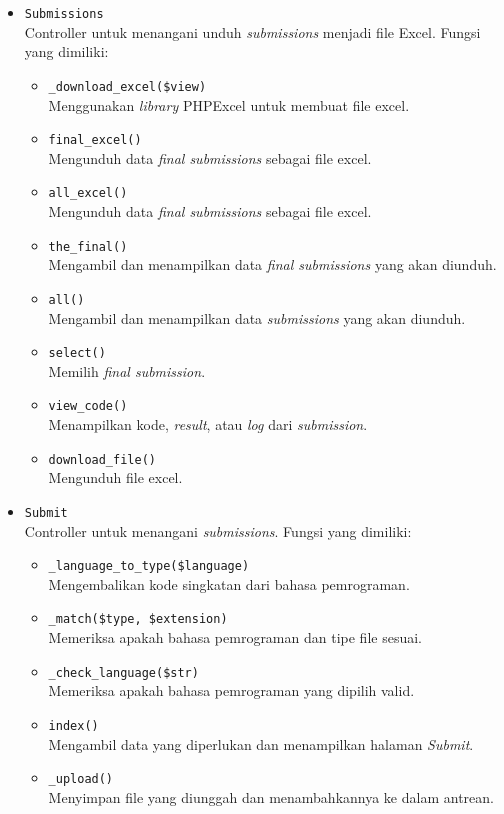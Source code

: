 \begin{itemize}
	\item \verb|Submissions| \\ Controller untuk menangani unduh \textit{submissions} menjadi file Excel. Fungsi yang dimiliki:
	\begin{itemize}
        \item \verb|_download_excel($view)| \\ Menggunakan \textit{library} PHPExcel untuk membuat file excel.
        \item \verb|final_excel()| \\ Mengunduh data \textit{final submissions} sebagai file excel.
        \item \verb|all_excel()| \\ Mengunduh data \textit{final submissions} sebagai file excel.
        \item \verb|the_final()| \\ Mengambil dan menampilkan data \textit{final submissions} yang akan diunduh.
        \item \verb|all()| \\ Mengambil dan menampilkan data \textit{submissions} yang akan diunduh.
        \item \verb|select()| \\ Memilih \textit{final submission}.
        \item \verb|view_code()| \\ Menampilkan kode, \textit{result}, atau \textit{log} dari \textit{submission}.
        \item \verb|download_file()| \\ Mengunduh file excel.
	\end{itemize}
	
	\item \verb|Submit| \\ Controller untuk menangani \textit{submissions}. Fungsi yang dimiliki:
	\begin{itemize}
        \item \verb|_language_to_type($language)| \\ Mengembalikan kode singkatan dari bahasa pemrograman.
        \item \verb|_match($type, $extension)| \\ Memeriksa apakah bahasa pemrograman dan tipe file sesuai.
        \item \verb|_check_language($str)| \\ Memeriksa apakah bahasa pemrograman yang dipilih valid.
        \item \verb|index()| \\ Mengambil data yang diperlukan dan menampilkan halaman \textit{Submit}.
        \item \verb|_upload()| \\ Menyimpan file yang diunggah dan menambahkannya ke dalam antrean.
	\end{itemize}
	

\end{itemize}
